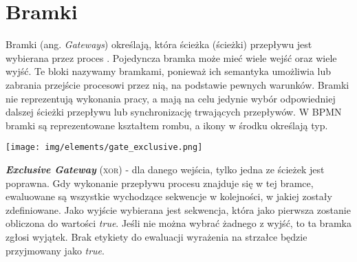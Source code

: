 \documentclass[declaration,shortabstract,mgr]{iithesis}
\newcommand{\bpmn}{BPMN }
\begin{document}
\section{Bramki}

Bramki (ang. \textit{Gateways}) określają, która ścieżka (ścieżki) przepływu jest wybierana przez proces \cite{bruce-silver-bpmn-gateways}. Pojedyncza bramka może mieć wiele wejść oraz wiele wyjść. Te bloki nazywamy bramkami, ponieważ ich semantyka umożliwia lub zabrania przejście procesowi przez nią, na podstawie pewnych warunków. Bramki nie reprezentują wykonania pracy, a mają na celu jedynie wybór odpowiedniej dalszej ścieżki przepływu lub synchronizację trwających przepływów. W \bpmn bramki są reprezentowane kształtem rombu, a ikony w środku określają typ.



\noindent\begin{minipage}[t]{0.075\textwidth}\vspace{0pt}
\texttt{[image: img/elements/gate\_exclusive.png]}
\end{minipage}\hfill
\begin{minipage}[t]{0.875\textwidth}\vspace{0pt}
\textbf{\textit{Exclusive Gateway}} (\textsc{xor}) - dla danego wejścia, tylko jedna ze ścieżek jest poprawna. Gdy wykonanie przepływu procesu znajduje się w tej bramce, ewaluowane są wszystkie wychodzące sekwencje w kolejności, w jakiej zostały zdefiniowane. Jako wyjście wybierana jest sekwencja, która jako pierwsza zostanie obliczona do wartości \textit{true}. Jeśli nie można wybrać żadnego z wyjść, to ta bramka zgłosi wyjątek. Brak etykiety do ewaluacji wyrażenia na strzałce będzie przyjmowany jako \textit{true}.
\end{minipage}

\vspace{\mypointsep}
\end{document}
